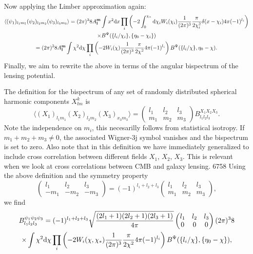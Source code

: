 \documentclass[11pt]{article} %
\DeclareRobustCommand{\d}{\ifmmode\text{d}\else d\fi}
\newcommand{\br}[1]{\ensuremath{\left( #1 \right)}}
\begin{document}
Now applying the Limber approximation again:
\begin{gather*}
    \langle (\psi_1)_{l_1m_1}(\psi_2)_{l_2m_2}(\psi_3)_{l_3m_3} \rangle 
    = (2\pi)^3 8 A_{\mathbf l}^{\mathbf m}\int x^2\d x\prod_i\br{-2\int_0^{\chi_*}\d\chi_i W_i(\chi_i)\frac{1}{(2\pi)^{3}}\frac{\pi}{2\chi_i^2}\delta(x-\chi_i)4\pi (-1)^{l_i}} \\ \times B^\Psi(\{l_i/\chi_i\}, \{\eta_0-\chi_i\}) \\
    = (2\pi)^3 8 A_{\mathbf l}^{\mathbf m}\int \chi^2\d \chi\prod_i\br{-2 W_i(\chi)\frac{1}{(2\pi)^{3}}\frac{\pi}{2\chi^2}4\pi (-1)^{l_i}} B^\Psi(\{l_i/\chi\}, \eta_0-\chi).
\end{gather*}
Finally, we aim to rewrite the above in terms of the angular bispectrum of the lensing potential. 

The definition for the bispectrum of any set of randomly distributed spherical harmonic components $X^k_{lm}$ is \cite{Hu2000}
\begin{equation*}
    \langle (X_1)_{l_1m_1}(X_2)_{l_2m_2}(X_3)_{x_3m_3} \rangle = \begin{pmatrix}
        l_1 & l_2 & l_3 \\ m_1 & m_2 & m_3
    \end{pmatrix}
    B_{l_1l_2l_3}^{X_1X_2X_3}.
\end{equation*}
Note the independence on $m_i$, this necesarilly follows from statistical isotropy. %
If $m_1+m_2+m_3\neq 0$, the associated Wigner-3j symbol vanishes and the bispectrum is set to zero.
Also note that in this definition we have immediately generalized to include cross correlation between different fields $X_1$, $X_2$, $X_3$. This is relevant when we look at cross correlations between CMB and galaxy lensing.
6758
Using the above definition and the symmetry property
\begin{equation*}
    \begin{pmatrix}
        l_1 & l_2 & l_3\\
        -m_1 & -m_2 & -m_3
      \end{pmatrix}
      =
      (-1)^{l_1+l_2+l_3}
      \begin{pmatrix}
        l_1 & l_2 & l_3\\
        m_1 & m_2 & m_3
      \end{pmatrix},
\end{equation*}
we find
\begin{gather*}
    B^{\psi_1\psi_2\psi_3}_{l_1l_2l_3}
    = (-1)^{l_1+l_2+l_3}
    \sqrt{\frac{(2l_1 + 1)(2l_2 + 1)(2l_3 + 1)}{4\pi}} \begin{pmatrix} l_1 & l_2 & l_3 \\ 0 & 0 & 0 \end{pmatrix}
    (2\pi)^3 8 \\
    \times \int \chi^2\d \chi\prod_i\br{-2 W_i(\chi, \chi_*)\frac{1}{(2\pi)^{3}}\frac{\pi}{2\chi^2}4\pi (-1)^{l_i}} B^\Psi(\{l_i/\chi\}, \{\eta_0-\chi\}),
\end{gather*}
\end{document}
